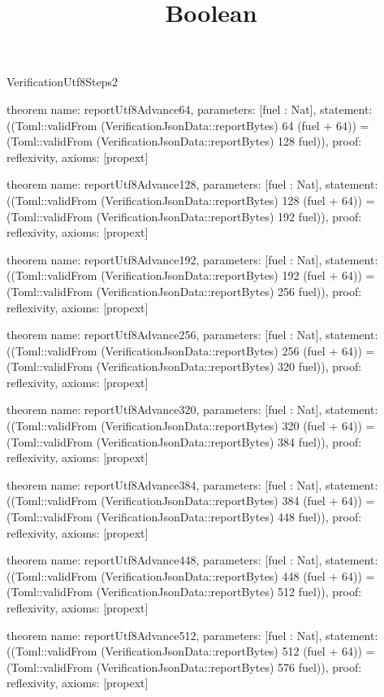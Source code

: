 \begin{lexlean}{VerificationUtf8Steps2}
\title{Boolean}
\begin{semanticmodule}

theorem{
  name: reportUtf8Advance64,
  parameters: [fuel : Nat],
  statement: ((Toml::validFrom (VerificationJsonData::reportBytes) 64 (fuel + 64)) = (Toml::validFrom (VerificationJsonData::reportBytes) 128 fuel)),
  proof: reflexivity{},
  axioms: [propext]
}

theorem{
  name: reportUtf8Advance128,
  parameters: [fuel : Nat],
  statement: ((Toml::validFrom (VerificationJsonData::reportBytes) 128 (fuel + 64)) = (Toml::validFrom (VerificationJsonData::reportBytes) 192 fuel)),
  proof: reflexivity{},
  axioms: [propext]
}

theorem{
  name: reportUtf8Advance192,
  parameters: [fuel : Nat],
  statement: ((Toml::validFrom (VerificationJsonData::reportBytes) 192 (fuel + 64)) = (Toml::validFrom (VerificationJsonData::reportBytes) 256 fuel)),
  proof: reflexivity{},
  axioms: [propext]
}

theorem{
  name: reportUtf8Advance256,
  parameters: [fuel : Nat],
  statement: ((Toml::validFrom (VerificationJsonData::reportBytes) 256 (fuel + 64)) = (Toml::validFrom (VerificationJsonData::reportBytes) 320 fuel)),
  proof: reflexivity{},
  axioms: [propext]
}

theorem{
  name: reportUtf8Advance320,
  parameters: [fuel : Nat],
  statement: ((Toml::validFrom (VerificationJsonData::reportBytes) 320 (fuel + 64)) = (Toml::validFrom (VerificationJsonData::reportBytes) 384 fuel)),
  proof: reflexivity{},
  axioms: [propext]
}

theorem{
  name: reportUtf8Advance384,
  parameters: [fuel : Nat],
  statement: ((Toml::validFrom (VerificationJsonData::reportBytes) 384 (fuel + 64)) = (Toml::validFrom (VerificationJsonData::reportBytes) 448 fuel)),
  proof: reflexivity{},
  axioms: [propext]
}

theorem{
  name: reportUtf8Advance448,
  parameters: [fuel : Nat],
  statement: ((Toml::validFrom (VerificationJsonData::reportBytes) 448 (fuel + 64)) = (Toml::validFrom (VerificationJsonData::reportBytes) 512 fuel)),
  proof: reflexivity{},
  axioms: [propext]
}

theorem{
  name: reportUtf8Advance512,
  parameters: [fuel : Nat],
  statement: ((Toml::validFrom (VerificationJsonData::reportBytes) 512 (fuel + 64)) = (Toml::validFrom (VerificationJsonData::reportBytes) 576 fuel)),
  proof: reflexivity{},
  axioms: [propext]
}

\end{semanticmodule}
\end{lexlean}

